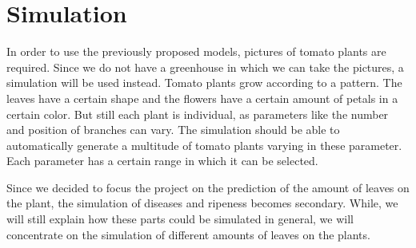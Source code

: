 \section{Simulation}
In order to use the previously proposed models, pictures of tomato plants are required. Since we do not have a greenhouse in which we can take the pictures, a simulation will be used instead. Tomato plants grow according to a pattern. The leaves have a certain shape and the flowers have a certain amount of petals in a certain color. But still each plant is individual, as parameters like the number and position of branches can vary. The simulation should be able to automatically generate a multitude of tomato plants varying in these parameter. Each parameter has a certain range in which it can be selected.

Since we decided to focus the project on the prediction of the amount of leaves on the plant, the simulation of diseases and ripeness becomes secondary. While, we will still explain how these parts could be simulated in general, we will concentrate on the simulation of different amounts of leaves on the plants.  